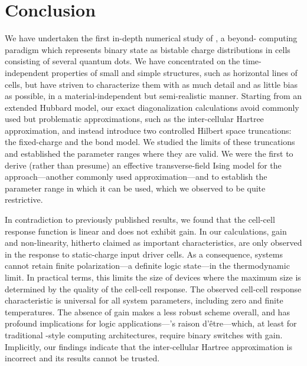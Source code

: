 \chapter{Conclusion}

We have undertaken the first in-depth numerical study of , a
beyond- computing paradigm which represents binary state as bistable
charge distributions in cells consisting of several quantum dots. We have
concentrated on the time-independent properties of small and simple structures,
such as horizontal lines of cells, but have striven to characterize them with as
much detail and as little bias as possible, in a material-independent but
semi-realistic manner. Starting from an extended Hubbard model, our exact
diagonalization calculations avoid commonly used but problematic approximations,
such as the inter-cellular Hartree approximation, and instead introduce two
controlled Hilbert space truncations: the fixed-charge and the bond model. We
studied the limits of these truncations and established the parameter ranges
where they are valid. We were the first to derive (rather than presume) an
effective transverse-field Ising model for the  approach---another
commonly used approximation---and to establish the parameter range in which it
can be used, which we observed to be quite restrictive.

In contradiction to previously published results, we found that the cell-cell
response function is linear and does not exhibit gain. In our calculations, gain
and non-linearity, hitherto claimed as important  characteristics, are
only observed in the response to static-charge input driver cells. As a
consequence,  systems cannot retain finite polarization---a definite
logic state---in the thermodynamic limit. In practical terms, this limits the
size of  devices where the maximum size is determined by the quality
of the cell-cell response. The observed cell-cell response characteristic is
universal for all system parameters, including zero and finite temperatures. The
absence of gain makes  a less robust scheme overall, and has profound
implications for logic applications---'s raison d'\^etre---which, at
least for traditional -style computing architectures, require binary
switches with gain. Implicitly, our findings indicate that the inter-cellular
Hartree approximation is incorrect and its results cannot be trusted.


